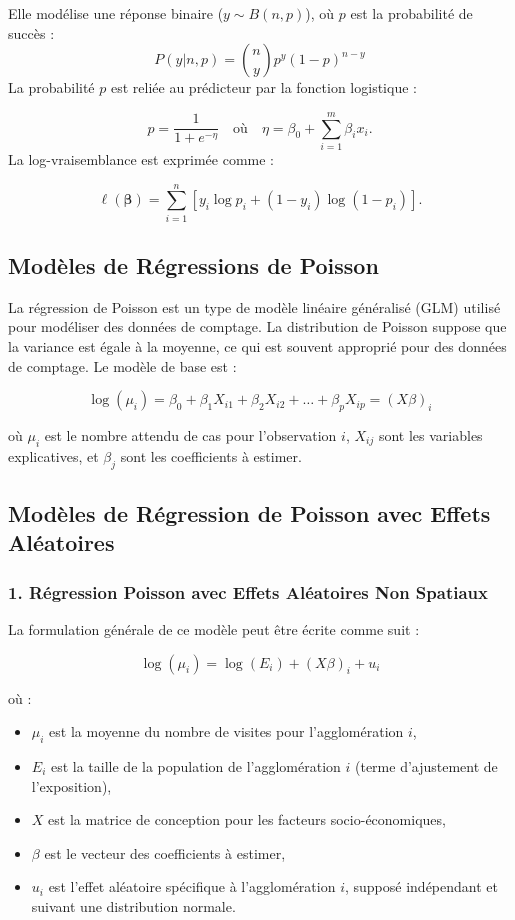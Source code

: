 \documentclass[
]{article}
\providecommand{\tightlist}{%
  \setlength{\itemsep}{0pt}\setlength{\parskip}{0pt}}
\begin{document}
Elle modélise une réponse binaire (\(y \sim B(n, p)\)), où \(p\) est la
probabilité de succès : \[
P(y | n, p) = \binom{n}{y} p^y (1-p)^{n-y}
\] La probabilité \(p\) est reliée au prédicteur par la fonction
logistique :

\[
p = \frac{1}{1 + e^{-\eta}} \quad \text{où} \quad \eta = \beta_0 + \sum_{i=1}^m \beta_i x_i.
\] La log-vraisemblance est exprimée comme :

\[
\ell(\boldsymbol{\beta}) = \sum_{i=1}^n \left[ y_i \log{p_i} + (1-y_i) \log{(1-p_i)} \right].
\]

\subsection{Modèles de Régressions de
Poisson}\label{moduxe8les-de-ruxe9gressions-de-poisson}

La régression de Poisson est un type de modèle linéaire généralisé (GLM)
utilisé pour modéliser des données de comptage. La distribution de
Poisson suppose que la variance est égale à la moyenne, ce qui est
souvent approprié pour des données de comptage. Le modèle de base est :

\[
\log(\mu_i) = \beta_0 + \beta_1 X_{i1} + \beta_2 X_{i2} + \dots + \beta_p X_{ip} = (X\beta)_i
\]

où \(\mu_i\) est le nombre attendu de cas pour l'observation \(i\),
\(X_{ij}\) sont les variables explicatives, et \(\beta_j\) sont les
coefficients à estimer.

\subsection{Modèles de Régression de Poisson avec Effets
Aléatoires}\label{moduxe8les-de-ruxe9gression-de-poisson-avec-effets-aluxe9atoires}

\subsubsection{1. Régression Poisson avec Effets Aléatoires Non
Spatiaux}\label{ruxe9gression-poisson-avec-effets-aluxe9atoires-non-spatiaux}

La formulation générale de ce modèle peut être écrite comme suit :

\[
\log(\mu_i) = \log(E_i) + (X\beta)_i + u_i
\]

où :

\begin{itemize}
\tightlist
\item
  \(\mu_i\) est la moyenne du nombre de visites pour l'agglomération
  \(i\),
\item
  \(E_i\) est la taille de la population de l'agglomération \(i\) (terme
  d'ajustement de l'exposition),
\item
  \(X\) est la matrice de conception pour les facteurs
  socio-économiques,
\item
  \(\beta\) est le vecteur des coefficients à estimer,
\item
  \(u_i\) est l'effet aléatoire spécifique à l'agglomération \(i\),
  supposé indépendant et suivant une distribution normale.
\end{itemize}
\end{document}
